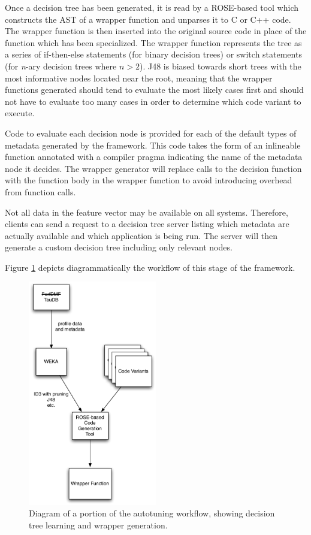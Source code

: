 \documentclass[msthesis,justified,copyright,final,numbers,sort&compress,
gsmodern,amstex,natbib]{uothesis}
\begin{document}
Once a decision tree has been generated, it is read by a ROSE-based tool which constructs the AST of a wrapper function and unparses it to C or C++ code. The wrapper function is then inserted into the original source code in place of the function which has been specialized. The wrapper function represents the tree as a series of if-then-else statements (for binary decision trees) or switch statements (for \emph{n}-ary decision trees where $n > 2$). J48 is biased towards short trees with the most informative nodes located near the root, meaning that the wrapper functions generated should tend to evaluate the most likely cases first and should not have to evaluate too many cases in order to determine which code variant to execute.

Code to evaluate each decision node is provided for each of the default types of metadata generated by the framework. This code takes the form of an inlineable function annotated with a compiler pragma indicating the name of the metadata node it decides. The wrapper generator will replace calls to the decision function with the function body in the wrapper function to avoid introducing overhead from function calls.

Not all data in the feature vector may be available on all systems. Therefore, clients can send a request to a decision tree server listing which metadata are actually available and which application is being run. The server will then generate a custom decision tree including only relevant nodes.

Figure \ref{fig:wrapgen} depicts diagrammatically the workflow of this stage of the framework.

\begin{figure}[btp]
\centering
\includegraphics[width=0.50\textwidth]{wrapgen.pdf}
\caption[Diagram of decision tree learning and wrapper generation]{Diagram of a portion of the autotuning workflow, showing decision tree learning and wrapper generation.}
\label{fig:wrapgen}
\end{figure}
\end{document}
